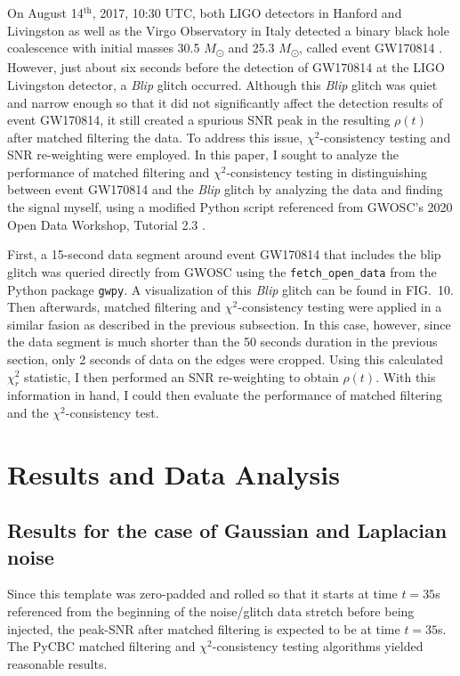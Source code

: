 \documentclass[preprint,
letterpaper,
 amsmath,amssymb,
 aps,
]{revtex4-2}
\def\code#1{\texttt{#1}}
\begin{document}
On August 14$^{\text{th}}$, 2017, 10:30 UTC, both LIGO detectors in Hanford and Livingston as well as the Virgo Observatory in Italy detected a binary black hole coalescence with initial masses 30.5 $M$\textsubscript{\(\odot\)} and 25.3 $M$\textsubscript{\(\odot\)}, called event GW170814 \cite{blip}. However, just about six seconds before the detection of GW170814 at the LIGO Livingston detector, a \textit{Blip} glitch occurred. Although this \textit{Blip} glitch was quiet and narrow enough so that it did not significantly affect the detection results of event GW170814, it still created a spurious SNR peak in the resulting $\rho(t)$ after matched filtering the data. To address this issue, $\chi^2$-consistency testing and SNR re-weighting were employed. In this paper, I sought to analyze the performance of matched filtering and $\chi^2$-consistency testing in distinguishing between event GW170814 and the \textit{Blip} glitch by analyzing the data and finding the signal myself, using a modified Python script referenced from GWOSC's 2020 Open Data Workshop, Tutorial 2.3 \cite{collaboration2019open}.

First, a 15-second data segment around event GW170814 that includes the blip glitch was queried directly from GWOSC using the \code{fetch\_open\_data} from the Python package \code{gwpy}. A visualization of this \textit{Blip} glitch can be found in FIG.\ 10. Then afterwards, matched filtering and $\chi^2$-consistency testing were applied in a similar fasion as described in the previous subsection. In this case, however, since the data segment is much shorter than the 50 seconds duration in the previous section, only 2 seconds of data on the edges were cropped. Using this calculated $\chi_r^2$ statistic, I then performed an SNR re-weighting to obtain $\hat{\rho}(t)$. With this information in hand, I could then evaluate the performance of matched filtering and the $\chi^2$-consistency test.



\section{Results and Data Analysis} \label{results}

\subsection{Results for the case of Gaussian and Laplacian noise}
Since this template was zero-padded and rolled so that it starts at time $t=35$s referenced from the beginning of the noise/glitch data stretch before being injected, the peak-SNR after matched filtering is expected to be at time $t=35$s. The PyCBC matched filtering and $\chi^2$-consistency testing algorithms yielded reasonable results.
\end{document}
